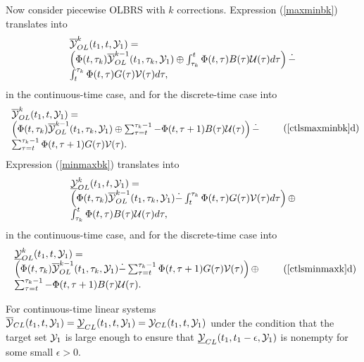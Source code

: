 Now consider piecewise OLBRS with $k$ corrections.
Expression (\ref{maxminbk}) translates into
\begin{equation}
\begin{array}{l}
\OYOL^k(t_1, t, \YY_1) = \\
\left(\Phi(t, \tau_k)\OYOL^{k-1}(t_1, \tau_k, \YY_1) \oplus
\int_{\tau_k}^t\Phi(t, \tau)B(\tau)\UU(\tau)d\tau\right) \dot{-} \\
\int^{\tau_k}_t\Phi(t, \tau)G(\tau)\VV(\tau)d\tau,
\end{array}
\label{ctlsmaxminbk}
\end{equation}
in the continuous-time case, and for the discrete-time case into
\begin{equation}
\begin{array}{l}
\OYOL^k(t_1, t, \YY_1) = \\
\left(\Phi(t, \tau_k)\OYOL^{k-1}(t_1, \tau_k, \YY_1) \oplus
\sum_{\tau=t}^{\tau_k-1}-\Phi(t, \tau+1)B(\tau)\UU(\tau)\right) \dot{-} \\
\sum_{\tau=t}^{\tau_k-1}\Phi(t, \tau+1)G(\tau)\VV(\tau).
\end{array}
\tag*{(\ref{ctlsmaxminbk}d)}
\label{dtlsmaxminbk}
\end{equation}
Expression (\ref{minmaxbk}) translates into
\begin{equation}
\begin{array}{l}
\UYOL^k(t_1, t, \YY_1) = \\
\left(\Phi(t, \tau_k)\OYOL^{k-1}(t_1, \tau_k, \YY_1) \dot{-}
\int^{\tau_k}_t\Phi(t, \tau)G(\tau)\VV(\tau)d\tau\right)
\oplus \\
\int_{\tau_k}^t\Phi(t, \tau)B(\tau)\UU(\tau)d\tau,
\end{array}
\label{ctlsminmaxbk}
\end{equation}
in the continuous-time case, and for the discrete-time case into
\begin{equation}
\begin{array}{l}
\UYOL^k(t_1, t, \YY_1) = \\
\left(\Phi(t, \tau_k)\OYOL^{k-1}(t_1, \tau_k, \YY_1) \dot{-}
\sum_{\tau=t}^{\tau_k-1}\Phi(t, \tau+1)G(\tau)\VV(\tau)\right)
\oplus \\
\sum_{\tau=t}^{\tau_k-1}-\Phi(t, \tau+1)B(\tau)\UU(\tau).
\end{array}
\tag*{(\ref{ctlsminmaxk}d)}
\label{dtlsminmaxbk}
\end{equation}

For continuous-time linear systems
$\OYCL(t_1, t, \YY_1) = \UYCL(t_1, t, \YY_1) = \YY_{CL}(t_1, t, \YY_1)$
under the condition that the target set $\YY_1$ is large enough to ensure
that $\UYCL(t_1, t_1-\epsilon, \YY_1)$ is nonempty for some small $\epsilon>0$.


